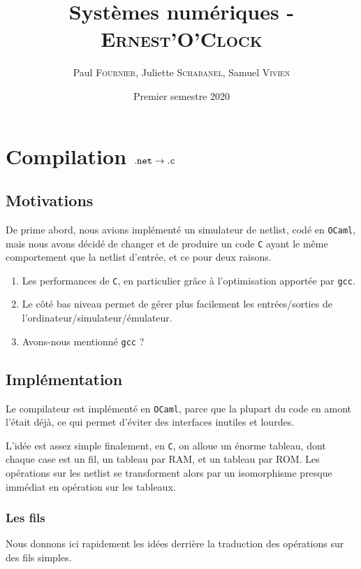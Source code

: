 \documentclass[10pt,a4paper,notitlepage ]{report}
\title{Systèmes numériques - \textsc{Ernest'O'Clock}}
\date{Premier semestre 2020}
\author{Paul \textsc{Fournier}, Juliette \textsc{Schabanel}, Samuel \textsc{Vivien}}
\begin{document}
	\maketitle
	\pagebreak
	\tableofcontents
	\pagebreak
	
	\section{Compilation $\tt{.net} \rightarrow \tt{.c}$}
	
	\subsection{Motivations}
	
	De prime abord, nous avions implémenté un simulateur de netlist, codé en \texttt{OCaml}, mais nous avons décidé de changer et de produire un code \texttt{C} ayant le même comportement que la netlist d'entrée, et ce pour deux raisons.
	\begin{enumerate}
		\item Les performances de \texttt{C}, en particulier grâce à l'optimisation apportée par \texttt{gcc}.
		\item Le côté bas niveau permet de gérer plus facilement les entrées/sorties de l'ordinateur/simulateur/émulateur.
		\item Avons-nous mentionné \texttt{gcc} ?
	\end{enumerate}
	
	\subsection{Implémentation}
	
	Le compilateur est implémenté en \texttt{OCaml}, parce que la plupart du code en amont l'était déjà, ce qui permet d'éviter des interfaces inutiles et lourdes.
	
	L'idée est assez simple finalement, en \texttt{C}, on alloue un énorme tableau, dont chaque case est un fil, un tableau par RAM, et un tableau par ROM. Les opérations sur les netlist se transforment alors par un isomorphisme presque immédiat en opération sur les tableaux.
	
	\subsubsection{Les fils}
	
	Nous donnons ici rapidement les idées derrière la traduction des opérations sur des fils simples.
	
\end{document}
